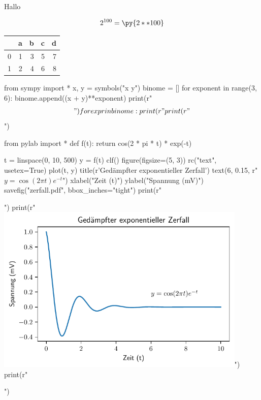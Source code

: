 \documentclass[12pt,ngerman]{scrartcl}
\begin{document}
Hallo


\[
2^{100}=\py{2**100}
\]

\begin{tabular}{lrrrr}
\toprule
{} &  a &  b &  c &  d \\
\midrule
0 &  1 &  3 &  5 &  7 \\
1 &  2 &  4 &  6 &  8 \\
\bottomrule
\end{tabular}

\begin{pycode}
from sympy import *
x, y = symbols("x y")
binome = []
for exponent in range(3, 6):
    binome.append((x + y)**exponent)
    print(r"\begin{align*}")
    for expr in binome:
        print(r"%
    print(r"\end{align*}")
\end{pycode}

\begin{pycode}
from pylab import *
def f(t):
    return cos(2 * pi * t) * exp(-t)

t = linspace(0, 10, 500)
y = f(t)
clf()
figure(figsize=(5, 3))
rc("text", usetex=True)
plot(t, y)
title(r'Ged\"ampfter exponentieller Zerfall') 
text(6, 0.15, r"$y = \cos(2 \pi t) e^{-t}$")
xlabel("Zeit (t)")
ylabel("Spannung (mV)")
savefig("zerfall.pdf", bbox_inches="tight")
print(r"\begin{center}")
print(r"\includegraphics[width=0.9\textwidth]{zerfall.pdf}")
print(r"\end{center}")
\end{pycode}
\end{document}
